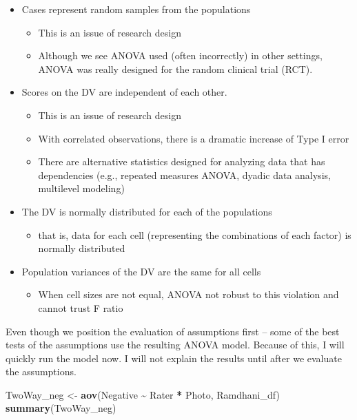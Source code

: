 \documentclass[
  11pt,
]{book}
\newenvironment{Shaded}{\begin{snugshade}}{\end{snugshade}}
\newcommand{\FunctionTok}[1]{\textcolor[rgb]{0.27,0.27,0.27}{\textbf{#1}}}
\newcommand{\NormalTok}[1]{#1}
\newcommand{\OtherTok}[1]{\textcolor[rgb]{0.37,0.37,0.37}{#1}}
\newcommand{\SpecialCharTok}[1]{\textcolor[rgb]{0.43,0.43,0.43}{\textbf{#1}}}
\providecommand{\tightlist}{%
  \setlength{\itemsep}{0pt}\setlength{\parskip}{0pt}}
\begin{document}
\begin{itemize}
\tightlist
\item
  Cases represent random samples from the populations

  \begin{itemize}
  \tightlist
  \item
    This is an issue of research design
  \item
    Although we see ANOVA used (often incorrectly) in other settings, ANOVA was really designed for the random clinical trial (RCT).
  \end{itemize}
\item
  Scores on the DV are independent of each other.

  \begin{itemize}
  \tightlist
  \item
    This is an issue of research design
  \item
    With correlated observations, there is a dramatic increase of Type I error
  \item
    There are alternative statistics designed for analyzing data that has dependencies (e.g., repeated measures ANOVA, dyadic data analysis, multilevel modeling)
  \end{itemize}
\item
  The DV is normally distributed for each of the populations

  \begin{itemize}
  \tightlist
  \item
    that is, data for each cell (representing the combinations of each factor) is normally distributed
  \end{itemize}
\item
  Population variances of the DV are the same for all cells

  \begin{itemize}
  \tightlist
  \item
    When cell sizes are not equal, ANOVA not robust to this violation and cannot trust F ratio
  \end{itemize}
\end{itemize}

Even though we position the evaluation of assumptions first -- some of the best tests of the assumptions use the resulting ANOVA model. Because of this, I will quickly run the model now. I will not explain the results until after we evaluate the assumptions.

\begin{Shaded}
\begin{Highlighting}[]
\NormalTok{TwoWay\_neg }\OtherTok{\textless{}{-}} \FunctionTok{aov}\NormalTok{(Negative }\SpecialCharTok{\textasciitilde{}}\NormalTok{ Rater }\SpecialCharTok{*}\NormalTok{ Photo, Ramdhani\_df)}
\FunctionTok{summary}\NormalTok{(TwoWay\_neg)}
\end{Highlighting}
\end{Shaded}
\end{document}
